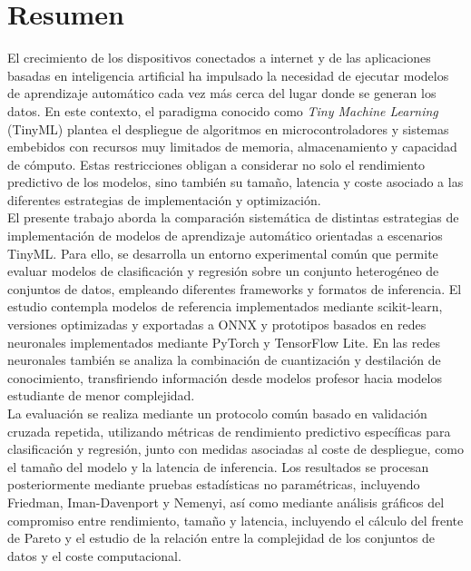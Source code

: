 \documentclass[a4paper,12pt,twoside,final]{book}
\begin{document}
\thispagestyle{empty}
\pagecolor{white}

\cleardoublepage

\chapter*{Resumen}

El crecimiento de los dispositivos conectados a internet y de las aplicaciones basadas en inteligencia artificial ha
impulsado la necesidad de ejecutar modelos de aprendizaje automático cada vez más cerca del lugar donde se generan los
datos. En este contexto, el paradigma conocido como \textit{Tiny Machine Learning} (TinyML) plantea el despliegue de
algoritmos en microcontroladores y sistemas embebidos con recursos muy limitados de memoria, almacenamiento y capacidad
de cómputo. Estas restricciones obligan a considerar no solo el rendimiento predictivo de los modelos, sino también su
tamaño, latencia y coste asociado a las diferentes estrategias de implementación y optimización.\\

El presente trabajo aborda la comparación sistemática de distintas estrategias de implementación de modelos de
aprendizaje automático orientadas a escenarios TinyML. Para ello, se desarrolla un entorno experimental común que
permite evaluar modelos de clasificación y regresión sobre un conjunto heterogéneo de conjuntos de datos, empleando
diferentes frameworks y formatos de inferencia. El estudio contempla modelos de referencia implementados mediante
scikit-learn, versiones optimizadas y exportadas a ONNX y prototipos basados en redes neuronales implementados mediante
PyTorch y TensorFlow Lite. En las redes neuronales también se analiza la combinación de cuantización y destilación de
conocimiento, transfiriendo información desde modelos profesor hacia modelos estudiante de menor complejidad.\\

La evaluación se realiza mediante un protocolo común basado en validación cruzada repetida, utilizando métricas de
rendimiento predictivo específicas para clasificación y regresión, junto con medidas asociadas al coste de despliegue,
como el tamaño del modelo y la latencia de inferencia. Los resultados se procesan posteriormente mediante pruebas
estadísticas no paramétricas, incluyendo Friedman, Iman-Davenport y Nemenyi, así como mediante análisis gráficos del
compromiso entre rendimiento, tamaño y latencia, incluyendo el cálculo del frente de Pareto y el estudio de la relación
entre la complejidad de los conjuntos de datos y el coste computacional.\\
\end{document}
